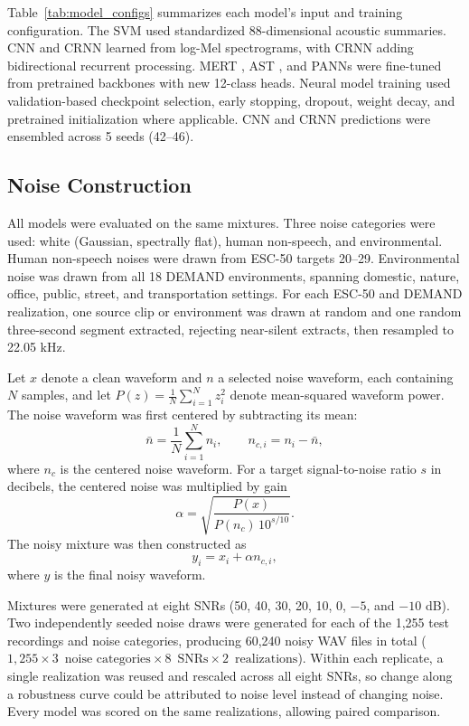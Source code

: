 \documentclass[conference]{IEEEtran}
\begin{document}
Table~\ref{tab:model_configs} summarizes each model's input and training configuration. The SVM used standardized 88-dimensional acoustic summaries. CNN and CRNN learned from log-Mel spectrograms, with CRNN adding bidirectional recurrent processing. MERT \cite{b14}, AST \cite{b15}, and PANNs \cite{b16} were fine-tuned from pretrained backbones with new 12-class heads. Neural model training used validation-based checkpoint selection, early stopping, dropout, weight decay, and pretrained initialization where applicable. CNN and CRNN predictions were ensembled across 5 seeds (42--46).


\subsection{Noise Construction}
All models were evaluated on the same mixtures. Three noise categories were used: white (Gaussian, spectrally flat), human non-speech, and environmental. Human non-speech noises were drawn from ESC-50 targets 20--29. Environmental noise was drawn from all 18 DEMAND environments, spanning domestic, nature, office, public, street, and transportation settings. For each ESC-50 and DEMAND realization, one source clip or environment was drawn at random and one random three-second segment extracted, rejecting near-silent extracts, then resampled to 22.05 kHz.

Let $x$ denote a clean waveform and $n$ a selected noise waveform, each containing $N$ samples, and let $P(z)=\frac{1}{N}\sum_{i=1}^{N}z_i^{2}$ denote mean-squared waveform power. The noise waveform was first centered by subtracting its mean:
\begin{equation}
\bar{n} = \frac{1}{N}\sum_{i=1}^{N}n_i,
\qquad
n_{c,i} = n_i-\bar{n},
\label{eq:noise_centering}
\end{equation}
where $n_c$ is the centered noise waveform. For a target signal-to-noise ratio $s$ in decibels, the centered noise was multiplied by gain
\begin{equation}
\alpha =
\sqrt{
\frac{P(x)}
{P(n_c)\,10^{s/10}}
}.
\label{eq:noise_gain}
\end{equation}
The noisy mixture was then constructed as
\begin{equation}
y_i = x_i+\alpha n_{c,i},
\label{eq:noise_mixture}
\end{equation}
where $y$ is the final noisy waveform.

Mixtures were generated at eight SNRs (50, 40, 30, 20, 10, 0, $-5$, and $-10$ dB). Two independently seeded noise draws were generated for each of the 1,255 test recordings and noise categories, producing 60,240 noisy WAV files in total ($1{,}255 \times 3\,\text{ noise categories} \times 8\,\text{ SNRs} \times 2\,\text{ realizations}$). Within each replicate, a single realization was reused and rescaled across all eight SNRs, so change along a robustness curve could be attributed to noise level instead of changing noise. Every model was scored on the same realizations, allowing paired comparison.
\end{document}
